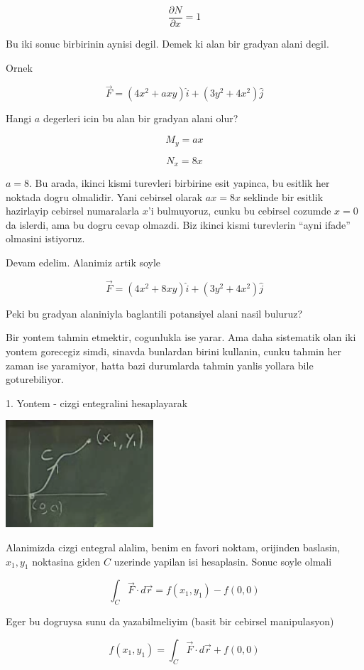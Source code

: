 \documentclass[12pt,fleqn]{article}\usepackage{../common}
\begin{document}
\[ \frac{\partial N}{\partial x} = 1 \]

Bu iki sonuc birbirinin aynisi degil. Demek ki alan bir gradyan alani
degil. 

Ornek

\[ \vec{F} = (4x^2 + axy)\hat{i} + (3y^2 + 4x^2)\hat{j} \]

Hangi $a$ degerleri icin bu alan bir gradyan alani olur? 

\[ M_y = ax \]

\[ N_x = 8x \]

$a=8$. Bu arada, ikinci kismi turevleri birbirine esit yapinca, bu esitlik
her noktada dogru olmalidir. Yani cebirsel olarak $ax = 8x$ seklinde bir
esitlik hazirlayip cebirsel numaralarla $x$'i bulmuyoruz, cunku bu cebirsel
cozumde $x=0$ da islerdi, ama bu dogru cevap olmazdi. Biz ikinci kismi
turevlerin ``ayni ifade'' olmasini istiyoruz.

Devam edelim. Alanimiz artik soyle

\[ \vec{F} = (4x^2 + 8xy)\hat{i} + (3y^2 + 4x^2)\hat{j} \]

Peki bu gradyan alaniniyla baglantili potansiyel alani nasil buluruz? 

Bir yontem tahmin etmektir, cogunlukla ise yarar. Ama daha sistematik olan
iki yontem gorecegiz simdi, sinavda bunlardan birini kullanin, cunku tahmin
her zaman ise yaramiyor, hatta bazi durumlarda tahmin yanlis yollara bile
goturebiliyor. 

1. Yontem - cizgi entegralini hesaplayarak 

\includegraphics[height=4cm]{21_2.png}

Alanimizda cizgi entegral alalim, benim en favori noktam, orijinden
baslasin, $x_1,y_1$ noktasina giden $C$ uzerinde yapilan isi hesaplasin.
Sonuc soyle olmali

\[ \int_C \vec{F} \cdot d\vec{r} = 
f(x_1,y_1) - f(0,0)
\]

Eger bu dogruysa sunu da yazabilmeliyim (basit bir cebirsel manipulasyon)

\[ f(x_1,y_1) = \int_C \vec{F} \cdot d\vec{r} + f(0,0) \]
\end{document}
